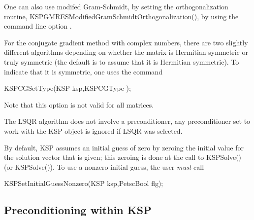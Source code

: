 One can also use
modifed Gram-Schmidt,
by setting the orthogonalization routine,
KSPGMRESModifiedGramSchmidtOrthogonalization(), by using the command line option
. 

For the conjugate gradient method with complex numbers, there are two
slightly different algorithms depending on whether the matrix is
Hermitian symmetric or truly symmetric (the default is to assume that
it is Hermitian symmetric). To indicate that it is symmetric, one uses the command
\begin{tabbing}
  KSPCGSetType(KSP ksp,KSPCGType );
\end{tabbing}
Note that this option is not valid for all matrices.

The LSQR algorithm does not involve a preconditioner, any preconditioner
set to work with the KSP object is ignored if LSQR was selected.

By default, KSP assumes an initial guess of zero by zeroing the initial
value for the solution vector that is given; this zeroing is done at the
call to KSPSolve() (or KSPSolve()). To use a nonzero
initial guess, the user {\em must} call
\begin{tabbing}
  KSPSetInitialGuessNonzero(KSP ksp,PetscBool  flg);
\end{tabbing}

\subsection{Preconditioning within KSP}
\label{sec_ksppc}

